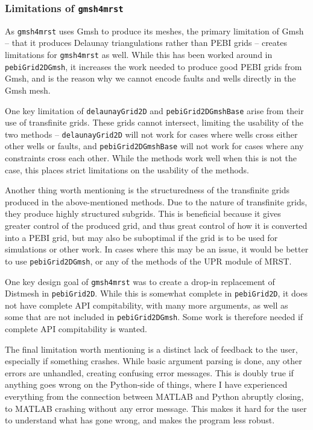 \subsubsection{Limitations of \texttt{gmsh4mrst}}
As \verb|gmsh4mrst| uses Gmsh to produce its meshes, the primary limitation of Gmsh -- that it produces Delaunay triangulations rather than PEBI grids -- creates limitations for \verb|gmsh4mrst| as well. While this has been worked around in \verb|pebiGrid2DGmsh|, it increases the work needed to produce good PEBI grids from Gmsh, and is the reason why we cannot encode faults and wells directly in the Gmsh mesh.

One key limitation of \verb|delaunayGrid2D| and \verb|pebiGrid2DGmshBase| arise from their use of transfinite grids. These grids cannot intersect, limiting the usability of the two methods -- \verb|delaunayGrid2D| will not work for cases where wells cross either other wells or faults, and \verb|pebiGrid2DGmshBase| will not work for cases where any constraints cross each other. While the methods work well when this is not the case, this places strict limitations on the usability of the methods.

Another thing worth mentioning is the structuredness of the transfinite grids produced in the above-mentioned methods. Due to the nature of transfinite grids, they produce highly structured subgrids. This is beneficial because it gives greater control of the produced grid, and thus great control of how it is converted into a PEBI grid, but may also be suboptimal if the grid is to be used for simulations or other work. In cases where this may be an issue, it would be better to use \verb|pebiGrid2DGmsh|, or any of the methods of the UPR module of MRST.

One key design goal of \verb|gmsh4mrst| was to create a drop-in replacement of Distmesh in \verb|pebiGrid2D|. While this is somewhat complete in \verb|pebiGrid2D|, it does not have complete API compitability, with many more arguments, as well as some that are not included in \verb|pebiGrid2DGmsh|. Some work is therefore needed if complete API compitability is wanted.

The final limitation worth mentioning is a distinct lack of feedback to the user, especially if something crashes. While basic argument parsing is done, any other errors are unhandled, creating confusing error messages. This is doubly true if anything goes wrong on the Python-side of things, where I have experienced everything from the connection between MATLAB and Python abruptly closing, to MATLAB crashing without any error message. This makes it hard for the user to understand what has gone wrong, and makes the program less robust.


